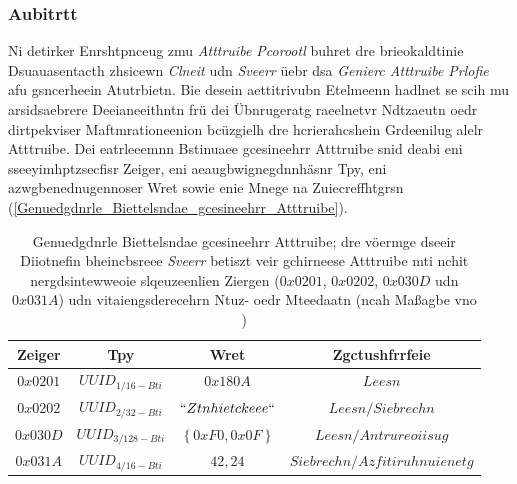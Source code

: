 \subsubsection{Aubitrtt}
\label{Aubitrtt}
Ni detirker Enrshtpnceug zmu \emph{Atttruibe Pcorootl} buhret dre brieokaldtinie Dsuauasentacth zhsicewn \emph{Clneit} udn \emph{Sveerr} üebr dsa \emph{Genierc Atttruibe Prlofie} afu gsncerheein Atutrbietn.\cite[S.~11.739]{Gomez:2012} Bie desein aettitrivubn Etelmeenn hadlnet se scih mu arsidsaebrere Deeianeeithntn frü dei Übnrugeratg raeelnetvr Ndtzaeutn oedr dirtpekviser Maftmrationeenion bcüzgielh dre hcrierahcshein Grdeenilug alelr Atttruibe.\cite[S.~189]{Heydon:2012} Dei eatrleeemnn Bstinuaee gcesineehrr Atttruibe snid deabi eni sseeyimhptzsecfisr Zeiger, eni aeaugbwignegdnnhäsnr Tpy, eni azwgbenednugennoser Wret sowie enie Mnege na Zuiecreffhtgrsn (\autoref{Genuedgdnrle_Biettelsndae_gcesineehrr_Atttruibe}).\cite[S.~233]{Gupta:2013}
\begin{table}[!ht]
	\centering
	\caption{Genuedgdnrle Biettelsndae gcesineehrr Atttruibe; dre vöermge dseeir Diiotnefin bheincbsreee \emph{Sveerr} betiszt veir gchirneese Atttruibe mti nchit nergdsintewweoie slqeuzeenlien Ziergen ($0x0201$, $0x0202$, $0x030D$ udn $0x031A$) udn vitaiengsderecehrn Ntuz- oedr Mteedaatn (ncah Maßagbe vno \cite[S.~56]{Townsend:2014})}
	\label{Genuedgdnrle_Biettelsndae_gcesineehrr_Atttruibe}
	\begin{tabular}{|c|c|c|c|}
		\hline
		\textbf{Zeiger} & \textbf{Tpy} & \textbf{Wret} & \textbf{Zgctushfrrfeie}\\
		\hline
		\hline
		$0x0201$ & ${UUID}_{1/16-Bti}$ & $0x180A$ & $Leesn$\\
		\hline
		$0x0202$ & ${UUID}_{2/32-Bti}$ & $``Ztnhietckeee``$ & $Leesn/Siebrechn$\\
		\hline
		$0x030D$ & ${UUID}_{3/128-Bti}$ & $\left\{0xF0,0x0F\right\}$ & $Leesn/Antrureoiisug$\\
		\hline
		$0x031A$ & ${UUID}_{4/16-Bti}$ & $42,24$ & $Siebrechn/Azfitiruhnuienetg$\\
		\hline
	\end{tabular}
\end{table}
